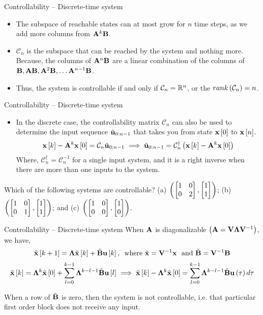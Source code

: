\documentclass[aspectratio=169]{beamer}
\def\mf{\ensuremath\mathbf}
\def\mb{\ensuremath\mathbb}
\def\lp{\ensuremath\left(}
\def\rp{\ensuremath\right)}
\def\ls{\ensuremath\left[}
\def\rs{\ensuremath\right]}
\def\bmx{\ensuremath\begin{bmatrix*}[r]}
\def\emx{\ensuremath\end{bmatrix*}}
\newcommand{\ct}[1]{\lp #1\rp}
\newcommand{\dt}[1]{\ls #1\rs}
\begin{document}
 
\begin{frame}[t]{Controllability -- Discrete-time system}
\begin{itemize}
    \item The subspace of reachable states can at most grow for $n$ time steps, as we add more columns from $\mf{A}^k\mf{B}$.

    \item $\mathcal{C}_{n}$ is the subspace that can be reached by the system and nothing more. Because, the columns of $\mf{A}^n\mf{B}$ are a linear combination of the columns of $\mf{B}, \mf{A}\mf{B}, \mf{A}^2\mf{B}, \ldots \mf{A}^{n-1}\mf{B}$.

    \item Thus, the system is controllable if and only if $\mathcal{C}_{n} = \mb{R}^n$, or the $rank \ct{\mathcal{C}_n} = n$.
\end{itemize}
\end{frame}


\begin{frame}{Controllability -- Discrete-time system}
\begin{itemize}
    \item In the discrete case, the controllability matrix $\mathcal{C}_n$ can also be used to determine the input sequence $\tilde{\mf{u}}_{0:n-1}$ that takes you from state $\mf{x}\dt{0}$ to $\mf{x}\dt{n}$.
    \[ \mf{x}\dt{k} - \mf{A}^{k}\mf{x}\dt{0} = \mathcal{C}_n \tilde{\mf{u}}_{0:n-1} \implies \tilde{\mf{u}}_{0:n-1} = \mathcal{C}_n^{\dagger} \ct{\mf{x}\dt{k} - \mf{A}^{k}\mf{x}\dt{0}} \]
    Where, $\mathcal{C}_n^\dagger = \mathcal{C}_n^{-1}$ for a single input system, and it is a right inverse when there are more than one inputs to the system.
\end{itemize}


Which of the following systems are controllable? (a) $\ct{\bmx 1 & 0 \\ 0 & 2 \emx, \bmx 1 \\ 1\emx}$; (b) $\ct{\bmx 1 & 0 \\ 0 & 1 \emx, \bmx 1 \\ 1\emx}$; and (c) $\ct{\bmx 1 & 0 \\ 0 & 0 \emx, \bmx 1\\ 0\emx}$.
\end{frame}


\begin{frame}{Controllability -- Discrete-time system}
When $\mf{A}$ is diagonalizable $\ct{\mf{A} = \mf{V}\mf{\Lambda}\mf{V}^{-1}}$, we have,
\[ \tilde{\mf{x}}\dt{k+1} = \mf{\Lambda}\tilde{\mf{x}}\dt{k} + \tilde{\mf{B}}\mf{u}\dt{k}, \,\,\,\text{where } \tilde{\mf{x}} = \mf{V}^{-1}\mf{x} \,\, \text{ and } \tilde{\mf{B}} = \mf{V}^{-1}\mf{B} \]
\[ \tilde{\mf{x}}\dt{k} = \mf{\Lambda}^k\tilde{\mf{x}}\dt{0} + \sum_{l=0}^{k-1} \mf{\Lambda}^{k - l - 1}\tilde{\mf{B}}\mf{u}\dt{l} \implies \tilde{\mf{x}}\dt{k} - \mf{\Lambda}^{k}\tilde{\mf{x}}\dt{0} =  \sum_{l=0}^{k-1}\mf{\Lambda}^{k-l-1}\tilde{\mf{B}}\mf{u}\ct{\tau}d\tau \]

When a row of $\tilde{\mf{B}}$ is zero, then the system is not controllable, i.e. that particular first order block does not receive any input.\vspace{0.2cm}
\end{frame}
\end{document}
